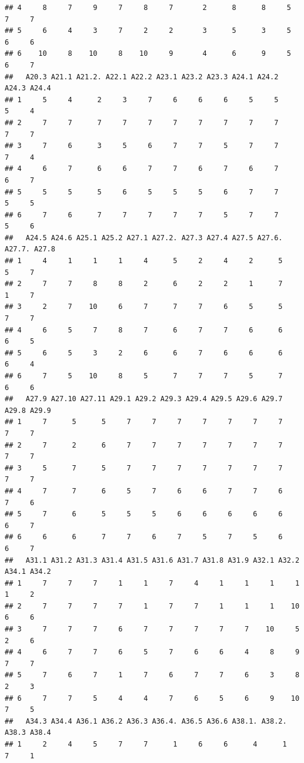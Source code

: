 \documentclass[
]{article}
\begin{document}
\begin{verbatim}
## 4     8     7     9     7     8     7       2      8      8     5     7     7
## 5     6     4     3     7     2     2       3      5      3     5     6     6
## 6    10     8    10     8    10     9       4      6      9     5     6     7
##   A20.3 A21.1 A21.2. A22.1 A22.2 A23.1 A23.2 A23.3 A24.1 A24.2 A24.3 A24.4
## 1     5     4      2     3     7     6     6     6     5     5     5     4
## 2     7     7      7     7     7     7     7     7     7     7     7     7
## 3     7     6      3     5     6     7     7     5     7     7     7     4
## 4     6     7      6     6     7     7     6     7     6     7     6     7
## 5     5     5      5     6     5     5     5     6     7     7     5     5
## 6     7     6      7     7     7     7     7     5     7     7     5     6
##   A24.5 A24.6 A25.1 A25.2 A27.1 A27.2. A27.3 A27.4 A27.5 A27.6. A27.7. A27.8
## 1     4     1     1     1     4      5     2     4     2      5      5     7
## 2     7     7     8     8     2      6     2     2     1      7      1     7
## 3     2     7    10     6     7      7     7     6     5      5      7     7
## 4     6     5     7     8     7      6     7     7     6      6      6     5
## 5     6     5     3     2     6      6     7     6     6      6      6     4
## 6     7     5    10     8     5      7     7     7     5      7      6     6
##   A27.9 A27.10 A27.11 A29.1 A29.2 A29.3 A29.4 A29.5 A29.6 A29.7 A29.8 A29.9
## 1     7      5      5     7     7     7     7     7     7     7     7     7
## 2     7      2      6     7     7     7     7     7     7     7     7     7
## 3     5      7      5     7     7     7     7     7     7     7     7     7
## 4     7      7      6     5     7     6     6     7     7     6     7     6
## 5     7      6      5     5     5     6     6     6     6     6     6     7
## 6     6      6      7     7     6     7     5     7     5     6     6     7
##   A31.1 A31.2 A31.3 A31.4 A31.5 A31.6 A31.7 A31.8 A31.9 A32.1 A32.2 A34.1 A34.2
## 1     7     7     7     1     1     7     4     1     1     1     1     1     2
## 2     7     7     7     7     1     7     7     1     1     1    10     6     6
## 3     7     7     7     6     7     7     7     7     7    10     5     2     6
## 4     6     7     7     6     5     7     6     6     4     8     9     7     7
## 5     7     6     7     1     7     6     7     7     6     3     8     2     3
## 6     7     7     5     4     4     7     6     5     6     9    10     7     5
##   A34.3 A34.4 A36.1 A36.2 A36.3 A36.4. A36.5 A36.6 A38.1. A38.2. A38.3 A38.4
## 1     2     4     5     7     7      1     6     6      4      1     7     1

\end{verbatim}
\end{document}
